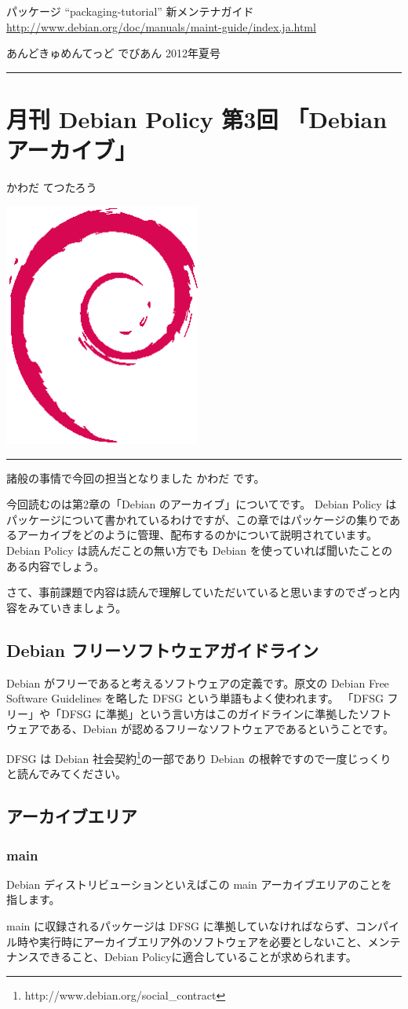 \documentclass[mingoth,a4paper]{jsarticle}
\renewcommand{\dancersection}[2]{%
\newpage
あんどきゅめんてっど でびあん 2012年夏号
%
\vspace{0.1mm}\\
{\color{dancerdarkblue}\rule{\hsize}{2mm}}

%
%
\begin{minipage}[t]{0.6\hsize}
\color{dancerdarkblue}
\vspace{1cm}
\section{#1}
\hfill{}#2\\
\end{minipage}
\begin{minipage}[t]{0.4\hsize}
\vspace{-2cm}
\hfill{}\includegraphics[height=8cm]{image200502/openlogo-nd.eps}\\
\vspace{-5cm}
\end{minipage}
%
{\color{dancerlightblue}\rule{0.66\hsize}{2mm}}
%
\vspace{2cm}
}
\begin{document}
\begin{thebibliography}{0}
  パッケージ ``packaging-tutorial''
  新メンテナガイド
	 \url{http://www.debian.org/doc/manuals/maint-guide/index.ja.html}
\end{thebibliography}

\clearpage
\dancersection{月刊 Debian Policy 第3回 「Debian アーカイブ」}{かわだ てつたろう}

諸般の事情で今回の担当となりました かわだ です。

今回読むのは第2章の「Debian のアーカイブ」についてです。
Debian Policy はパッケージについて書かれているわけですが、この章ではパッケージの集りであるアーカイブをどのように管理、配布するのかについて説明されています。
Debian Policy は読んだことの無い方でも Debian を使っていれば聞いたことのある内容でしょう。

さて、事前課題で内容は読んで理解していただいていると思いますのでざっと内容をみていきましょう。

\subsection{Debian フリーソフトウェアガイドライン}

Debian がフリーであると考えるソフトウェアの定義です。原文の Debian Free Software Guidelines を略した DFSG という単語もよく使われます。
「DFSG フリー」や「DFSG に準拠」という言い方はこのガイドラインに準拠したソフトウェアである、Debian が認めるフリーなソフトウェアであるということです。

DFSG は Debian 社会契約\footnote{http://www.debian.org/social\_contract}の一部であり Debian の根幹ですので一度じっくりと読んでみてください。

\subsection{アーカイブエリア}
\subsubsection{main}
Debian ディストリビューションといえばこの main アーカイブエリアのことを指します。

main に収録されるパッケージは DFSG に準拠していなければならず、コンパイル時や実行時にアーカイブエリア外のソフトウェアを必要としないこと、メンテナンスできること、Debian Policyに適合していることが求められます。
\end{document}

